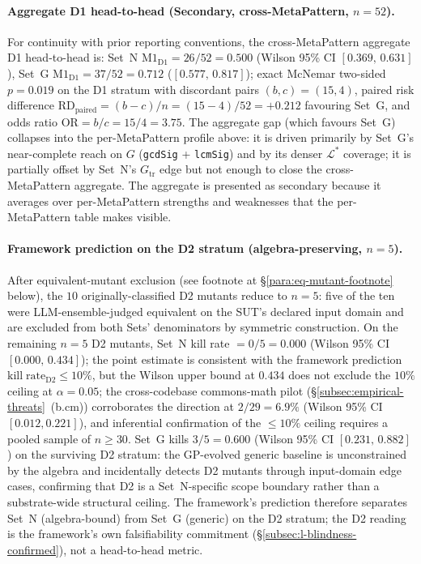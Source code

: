 \documentclass[acmsmall,screen,review]{acmart}
\begin{document}
\paragraph{Aggregate D1 head-to-head (Secondary, cross-MetaPattern, $n = 52$).}
For continuity with prior reporting conventions, the cross-MetaPattern
aggregate D1 head-to-head is: Set~N
$\mathrm{M1}_{\mathrm{D1}} = 26/52 = 0.500$ (Wilson 95\% CI
$[0.369,\,0.631]$), Set~G $\mathrm{M1}_{\mathrm{D1}} = 37/52 =
0.712$ ($[0.577,\,0.817]$); exact McNemar two-sided $p = 0.019$
on the D1 stratum with discordant pairs $(b,c) = (15,4)$, paired
risk difference $\mathrm{RD}_{\mathrm{paired}} = (b - c) / n =
(15 - 4) / 52 = +0.212$ favouring Set~G, and odds ratio
$\mathrm{OR} = b / c = 15 / 4 = 3.75$. The
aggregate gap (which favours Set~G) collapses into the per-MetaPattern
profile above: it is driven primarily by Set~G's near-complete
reach on $G$ (\texttt{gcdSig} + \texttt{lcmSig}) and by its denser
$\mathcal{L}^{*}$ coverage; it is partially offset by Set~N's
$G_{\mathrm{tr}}$ edge but not enough to close the cross-MetaPattern
aggregate. The aggregate is presented as secondary because it
averages over per-MetaPattern strengths and weaknesses that the
per-MetaPattern table makes visible.

\paragraph{Framework prediction on the D2 stratum (algebra-preserving, $n = 5$).}
After equivalent-mutant exclusion (see footnote at
\S\ref{para:eq-mutant-footnote} below), the $10$ originally-classified
D2 mutants reduce to $n = 5$: five of the ten were
LLM-ensemble-judged equivalent on the SUT's declared input domain
and are excluded from both Sets' denominators by symmetric construction.
On the remaining $n = 5$ D2 mutants, Set~N kill rate $= 0/5 = 0.000$
(Wilson 95\% CI $[0.000,\,0.434]$); the point estimate is consistent
with the framework prediction
$\mathrm{kill\;rate}_{\mathrm{D2}} \le 10\%$, but the Wilson upper bound
at $0.434$ does not exclude the $10\%$ ceiling at $\alpha = 0.05$; the
cross-codebase commons-math pilot
(\S\ref{subsec:empirical-threats}~(b.cm))
corroborates the direction at $2/29 = 6.9\%$
(Wilson 95\% CI $[0.012, 0.221]$), and inferential
confirmation of the $\le 10\%$ ceiling requires a pooled sample of
$n \ge 30$. Set~G kills $3/5 = 0.600$
(Wilson 95\% CI $[0.231,\,0.882]$) on the surviving D2 stratum:
the GP-evolved generic baseline is unconstrained by the algebra
and incidentally detects D2 mutants through input-domain edge cases,
confirming that D2 is a Set~N-specific scope boundary rather than a
substrate-wide structural ceiling. The framework's prediction
therefore separates Set~N (algebra-bound) from Set~G (generic) on
the D2 stratum; the D2 reading is the framework's own falsifiability
commitment (\S\ref{subsec:l-blindness-confirmed}), not a head-to-head metric.
\end{document}
